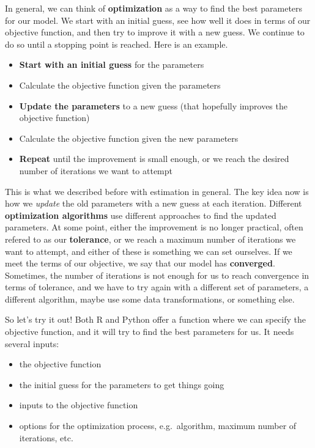 \documentclass[
  letterpaper,
]{krantz}
\providecommand{\tightlist}{%
  \setlength{\itemsep}{0pt}\setlength{\parskip}{0pt}}\usepackage{longtable,booktabs,array}
\begin{document}
In general, we can think of \textbf{optimization} as a way to find the
best parameters for our model. We start with an initial guess, see how
well it does in terms of our objective function, and then try to improve
it with a new guess. We continue to do so until a stopping point is
reached. Here is an example.

\begin{itemize}
\tightlist
\item
  \textbf{Start with an initial guess} for the parameters
\item
  Calculate the objective function given the parameters
\item
  \textbf{Update the parameters} to a new guess (that hopefully improves
  the objective function)
\item
  Calculate the objective function given the new parameters
\item
  \textbf{Repeat} until the improvement is small enough, or we reach the
  desired number of iterations we want to attempt
\end{itemize}

This is what we described before with estimation in general. The key
idea now is how we \emph{update} the old parameters with a new guess at
each iteration. Different \textbf{optimization algorithms} use different
approaches to find the updated parameters. At some point, either the
improvement is no longer practical, often refered to as our
\textbf{tolerance}, or we reach a maximum number of iterations we want
to attempt, and either of these is something we can set ourselves. If we
meet the terms of our objective, we say that our model has
\textbf{converged}. Sometimes, the number of iterations is not enough
for us to reach convergence in terms of tolerance, and we have to try
again with a different set of parameters, a different algorithm, maybe
use some data transformations, or something else.

So let's try it out! Both R and Python offer a function where we can
specify the objective function, and it will try to find the best
parameters for us. It needs several inputs:

\begin{itemize}
\tightlist
\item
  the objective function
\item
  the initial guess for the parameters to get things going
\item
  inputs to the objective function
\item
  options for the optimization process, e.g.~algorithm, maximum number
  of iterations, etc.
\end{itemize}
\end{document}
